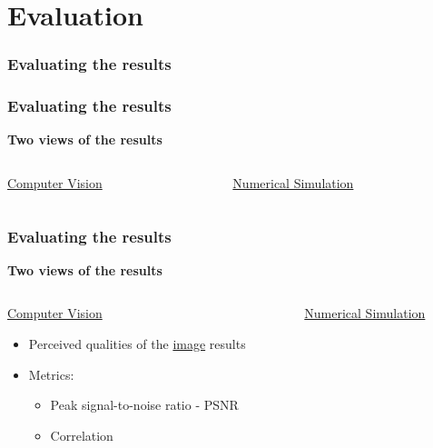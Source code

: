 \documentclass[18pt]{beamer}
\begin{document}
\section{Evaluation}

\begin{frame}
  \frametitle{Evaluating the results}
\end{frame}

\begin{frame}[t]
  \frametitle{Evaluating the results}
  \begin{center}
    \textbf{\Large Two views of the results}
  \end{center}

  \begin{columns}[t]
    \begin{column}{0.5\textwidth}
      \begin{center}
        {\large \underline{Computer Vision}}
      \end{center}
    \end{column}
    \begin{column}{0.5\textwidth}
      \begin{center}
        {\large \underline{Numerical Simulation}}
      \end{center}  
    \end{column}
  \end{columns}
\end{frame}


\begin{frame}[t]
  \frametitle{Evaluating the results}
  \begin{center}
    \textbf{\Large Two views of the results}
  \end{center}
  \begin{columns}[t]
    \begin{column}{0.5\textwidth}
      \begin{center}
        {\large \underline{Computer Vision}}
        \begin{itemize}
        \item Perceived qualities of the \underline{image} results
        \item Metrics:
          \begin{itemize}
          \item Peak signal-to-noise ratio - PSNR
          \item Correlation
          \end{itemize}
        \end{itemize}
      \end{center}
    \end{column}
    \begin{column}{0.5\textwidth}
      \begin{center}
        {\large \underline{Numerical Simulation}}
      \end{center}  
    \end{column}
  \end{columns}
\end{frame}
\end{document}
